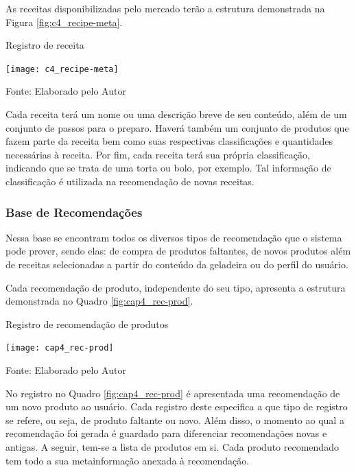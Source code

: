 As receitas disponibilizadas pelo mercado terão a estrutura demonstrada na Figura \ref{fig:c4_recipe-meta}.

\begin{quadro}[htb]
    \caption{Registro de receita}
    \label{fig:c4_recipe-meta}
    \texttt{[image: c4\_recipe-meta]}
    
    \footnotesize{Fonte: Elaborado pelo Autor}
\end{quadro}

Cada receita terá um nome ou uma descrição breve de seu conteúdo, além de um conjunto de passos para o preparo. Haverá também um conjunto de produtos que fazem parte da receita bem como suas respectivas classificações e quantidades necessárias à receita. Por fim, cada receita terá sua própria classificação, indicando que se trata de uma torta ou bolo, por exemplo. Tal informação de classificação é utilizada na recomendação de novas receitas.

\ProximoForaDoSumario 
\subsubsection{Base de Recomendações}


Nessa base se encontram todos os diversos tipos de recomendação que o sistema pode prover, sendo elas: de compra de produtos faltantes, de novos produtos além de receitas selecionadas a partir do conteúdo da geladeira ou do perfil do usuário.

Cada recomendação de produto, independente do seu tipo, apresenta a estrutura demonstrada no Quadro \ref{fig:cap4_rec-prod}.

\begin{quadro}[htb]
    \caption{Registro de recomendação de produtos}
    \label{fig:cap4_rec-prod}
    \texttt{[image: cap4\_rec-prod]}
    
    \footnotesize{Fonte: Elaborado pelo Autor}
\end{quadro}

No registro no Quadro \ref{fig:cap4_rec-prod} é apresentada uma recomendação de um novo produto ao usuário. Cada registro deste especifica a que tipo de registro se refere, ou seja, de produto faltante ou novo. Além disso, o momento ao qual a recomendação foi gerada é guardado para diferenciar recomendações novas e antigas. A seguir, tem-se a lista de produtos em si. Cada produto recomendado tem todo a sua metainformação anexada à recomendação.

